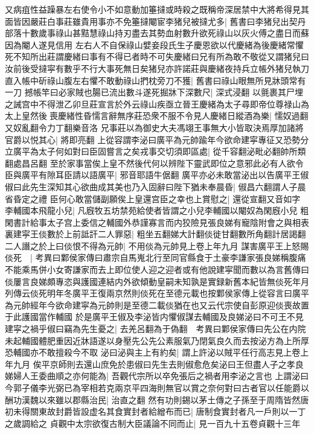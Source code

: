 又病疽性益躁暴左右使令小不如意動加箠撻或時殺之既稱帝深居禁中大將希得見其面皆因嚴莊白事莊雖貴用事亦不免箠撻閹宦李猪兒被撻尤多|{
	舊書曰李猪兒出契丹部落十數歲事祿山甚黠慧祿山持刃盡去其勢血射數升欲死祿山以灰火傅之盡日而蘇因為閹人遂見信用}
左右人不自保祿山嬖妾段氏生子慶恩欲以代慶緒為後慶緒常懼死不知所出莊謂慶緒曰事有不得已者時不可失慶緒曰兄有所為敢不敬從又謂猪兒曰汝前後受撻寜有數乎不行大事死無日矣猪兒亦許諾莊與慶緒夜持兵立帳外猪兒執刀直入帳中斫祿山腹左右懼不敢動祿山捫枕旁刀不獲|{
	舊書曰祿山眼無所見牀頭常有一刀}
撼帳竿曰必家賊也腸已流出數斗遂死掘牀下深數尺|{
	深式浸翻}
以氈裹其尸埋之誡宫中不得泄乙卯旦莊宣言於外云祿山疾亟立晉王慶緒為太子尋即帝位尊禄山為太上皇然後喪慶緒性昏懦言辭無序莊恐衆不服不令見人慶緒日縱酒為樂|{
	懦奴過翻又奴亂翻令力丁翻樂音洛}
兄事莊以為御史大夫馮翊王事無大小皆取決焉厚加諸將官爵以悦其心|{
	將即亮翻}
上從容謂李泌曰廣平為元帥踰年今欲命建寜專征又恐勢分立廣平為太子何如對曰臣固嘗言之矣戎事交切須即區處|{
	從千容翻泌毗必翻帥所類翻處昌呂翻}
至於家事當俟上皇不然後代何以辨陛下靈武即位之意邪此必有人欲令臣與廣平有隙耳臣請以語廣平|{
	邪音耶語牛倨翻}
廣平亦必未敢當泌出以告廣平王俶俶曰此先生深知其心欲曲成其美也乃入固辭曰陛下猶未奉晨昏|{
	俶昌六翻謂人子晨省昏定之禮}
臣何心敢當儲副願俟上皇還宫臣之幸也上賞慰之|{
	還從宣翻又音如字}
李輔國本飛龍小兒|{
	凡廐牧五坊禁苑給使者皆謂之小兒李輔國以閹奴為閑廐小兒}
粗閑書計給事太子宫上委信之輔國外恭謹寡言而内狡險見張良娣有寵陰附會之與相表裏建寜王倓數於上前詆訐二人罪惡|{
	粗坐五翻娣大計翻倓徙甘翻數所角翻計居謁翻}
二人譖之於上曰倓恨不得為元帥|{
	不用倓為元帥見上卷上年九月}
謀害廣平王上怒賜倓死　|{
	考異曰鄴侯家傳曰肅宗自馬嵬北行至同官縣食于土豪李謙家張良娣稱腹痛不能乘馬併小女寄謙家而去上即位使人迎之迎者或有他說建寜聞而數以為言舊傳曰倓屢言良娣頗專恣與護國連結内外欲傾動皇嗣未知孰是實録新舊本紀皆無倓死年月列傳云倓死明年冬廣平王復兩京然則倓死在至德元載也按鄴侯家傳上從容言曰廣平為元帥經年今欲命建寜為元帥則是至德二載倓猶在也又云代宗使自彭原迎倓喪故置于此護國當作輔國}
於是廣平王俶及李泌皆内懼俶謀去輔國及良娣泌曰不可王不見建寜之禍乎俶曰竊為先生憂之|{
	去羌呂翻為于偽翻　考異曰鄴侯家傳曰先公在内院未起輔國體肥重因近牀語遂以身壓先公先公素服氣乃閉氣良久而去按泌方為上所厚恐輔國亦不敢擅殺今不取}
泌曰泌與主上有約矣|{
	謂上許泌以賊平任行高志見上卷上年九月}
俟平京師則去還山庶免於患俶曰先生去則俶愈危矣泌曰王但盡人子之孝良娣婦人王委曲順之亦何能為|{
	吾觀代宗所以卒免張后之禍者用李泌之言也}
上謂泌曰今郭子儀李光弼已為宰相若克兩京平四海則無官以賞之奈何對曰古者官以任能爵以酬功漢魏以來雖以郡縣治民|{
	治直之翻}
然有功則錫以茅土傳之子孫至于周隋皆然唐初未得關東故封爵皆設虚名其食實封者給繒布而已|{
	唐制食實封者凡一戶則以一丁之歲調給之}
貞觀中太宗欲復古制大臣議論不同而止|{
	見一百九十五卷貞觀十三年}

